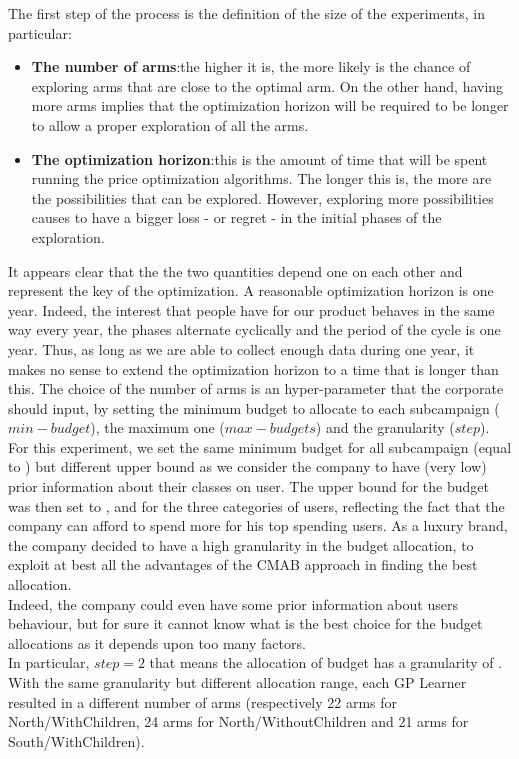 The first step of the process is the definition of the size of the experiments, in particular:
\begin{itemize}
	\item \textbf{The number of arms}:\@  the higher it is, the more likely is the chance of exploring
	arms that are close to the optimal arm. On the other hand, having more arms
	implies that the optimization horizon will be required to be longer to allow a
	proper exploration of all the arms.
	\item \textbf{The optimization horizon}:\@  this is the amount of time that will be spent
	running the price optimization algorithms. The longer this is, the more are
	the possibilities that can be explored. However, exploring more possibilities
	causes to have a bigger loss - or regret - in the initial phases of the exploration.
\end{itemize} 
It appears clear that the the two quantities depend one on each other
and represent the key of the optimization. A reasonable optimization horizon is
one year. Indeed, the interest that people have for our product behaves in the same way every
year, the phases alternate cyclically and the period of the cycle is one year.
Thus, as long as we are able to collect enough data during one year, it makes no
sense to extend the optimization horizon to a time that is longer than this.
The choice of the number of arms is an hyper-parameter that the corporate should input, by setting the minimum budget to allocate to each subcampaign ($min-budget$), the maximum one ($max-budgets$) and the granularity ($step$).
\\For this experiment, we set the same minimum budget for all subcampaign (equal to ) but different upper bound as we consider the company to have (very low) prior information about their classes on user. The upper bound for the budget was then set to ,  and  for the three categories of users, reflecting the fact that the company can afford to spend more for his top spending users.
As a luxury brand, the company decided to have a high granularity in the budget allocation, to exploit at best all the advantages of the CMAB approach in finding the best allocation.
\\Indeed, the company could even have some prior information about users behaviour, but for sure it cannot know what is the best choice for the budget allocations as it depends upon too many factors.
\\In particular, $step=2$ that means the allocation of budget has a granularity of . With the same granularity but different allocation range, each GP Learner resulted in a different number of arms (respectively 22 arms for North/WithChildren, 24 arms for North/WithoutChildren and 21 arms for South/WithChildren).